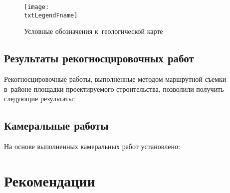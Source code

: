 \begin{figure}[!h]
	\centering
	\texttt{[image: \\txtLegendFname]}
	\caption[Условные обозначения]{Условные обозначения к~геологической карте}
	\label{img:legend}
\end{figure}

\subsection{Результаты рекогносцировочных работ}
Рекогносцировочные работы, выполненные методом маршрутной съемки в~районе площадки проектируемого строительства, позволили получить следующие результаты:

\txtRecog

\subsection{Камеральные работы}
На основе выполненных камеральных работ установлено:
\txtCamer

\section{Рекомендации}
\txtRecommend




